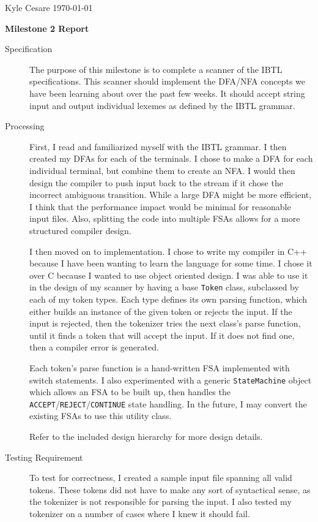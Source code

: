\documentclass[12pt,letterpaper]{article}
\begin{document}
Kyle Cesare \hfill
\today \hfill

{\center\textbf{Milestone 2 Report} \\}

\begin{description}

\item[Specification] The purpose of this milestone is to complete a scanner of
  the IBTL specifications. This scanner should implement the DFA/NFA concepts we
  have been learning about over the past few weeks. It should accept string
  input and output individual lexemes as defined by the IBTL grammar.

\item[Processing] First, I read and familiarized myself with the IBTL grammar. I
  then created my DFAs for each of the terminals. I chose to make a DFA for each
  individual terminal, but combine them to create an NFA. I would then design
  the compiler to push input back to the stream if it chose the incorrect
  ambiguous transition. While a large DFA might be more efficient, I think that
  the performance impact would be minimal for reasonable input files. Also,
  splitting the code into multiple FSAs allows for a more structured compiler
  design.

  I then moved on to implementation. I chose to write my compiler in C++ because
  I have been wanting to learn the language for some time. I chose it over C
  because I wanted to use object oriented design. I was able to use it in the
  design of my scanner by having a base \texttt{Token} class, subclassed by each
  of my token types. Each type defines its own parsing function, which either
  builds an instance of the given token or rejects the input. If the input is
  rejected, then the tokenizer tries the next class's parse function, until it
  finds a token that will accept the input. If it does not find one, then a
  compiler error is generated.

  Each token's parse function is a hand-written FSA implemented with switch
  statements. I also experimented with a generic \texttt{StateMachine} object
  which allows an FSA to be built up, then handles the
  \texttt{ACCEPT}/\texttt{REJECT}/\texttt{CONTINUE} state handling. In the
  future, I may convert the existing FSAs to use this utility class.

  Refer to the included design hierarchy for more design details.

\item[Testing Requirement] To test for correctness, I created a sample input
  file spanning all valid tokens. These tokens did not have to make any sort of
  syntactical sense, as the tokenizer is not responsible for parsing the input.
  I also tested my tokenizer on a number of cases where I knew it should fail.


\end{description}
\end{document}
